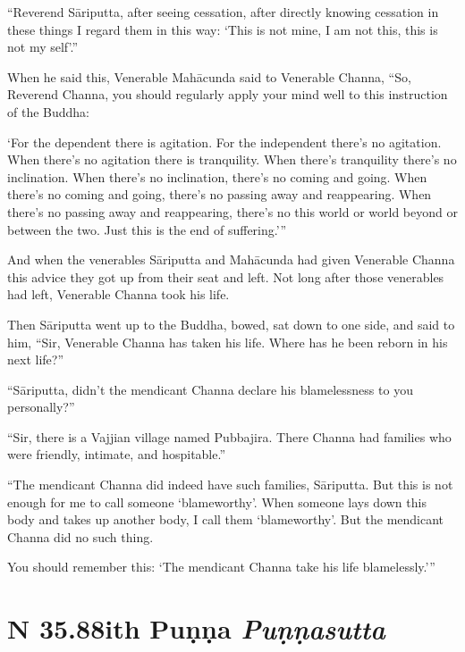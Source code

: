 \documentclass[12pt,openany]{book}%
\newcommand*{\suttatitleacronym}[1]{\smaller[2]{#1}\vspace*{.3em}}
\newcommand*{\suttatitletranslation}[1]{\linebreak{#1}}
\newcommand*{\suttatitleroot}[1]{\linebreak\smaller[2]\itshape{#1}}
\newcommand*{\tocacronym}[1]{\hspace*{-3.3em}{#1}\quad}
\newcommand*{\toctranslation}[1]{#1}
\newcommand*{\tocroot}[1]{(\textit{#1})}
\begin{document}
“Reverend \textsanskrit{Sāriputta}, after seeing cessation, after directly knowing cessation in these things I regard them in this way: ‘This is not mine, I am not this, this is not my self’.” 

When he said this, Venerable \textsanskrit{Mahācunda} said to Venerable Channa, “So, Reverend Channa, you should regularly apply your mind well to this instruction of the Buddha: 

‘For the dependent there is agitation. For the independent there’s no agitation. When there’s no agitation there is tranquility. When there’s tranquility there’s no inclination. When there’s no inclination, there’s no coming and going. When there’s no coming and going, there’s no passing away and reappearing. When there’s no passing away and reappearing, there’s no this world or world beyond or between the two. Just this is the end of suffering.’” 

And when the venerables \textsanskrit{Sāriputta} and \textsanskrit{Mahācunda} had given Venerable Channa this advice they got up from their seat and left. Not long after those venerables had left, Venerable Channa took his life. 

Then \textsanskrit{Sāriputta} went up to the Buddha, bowed, sat down to one side, and said to him, “Sir, Venerable Channa has taken his life. Where has he been reborn in his next life?” 

“\textsanskrit{Sāriputta}, didn’t the mendicant Channa declare his blamelessness to you personally?” 

“Sir, there is a Vajjian village named Pubbajira. There Channa had families who were friendly, intimate, and hospitable.” 

“The mendicant Channa did indeed have such families, \textsanskrit{Sāriputta}. But this is not enough for me to call someone ‘blameworthy’. When someone lays down this body and takes up another body, I call them ‘blameworthy’. But the mendicant Channa did no such thing. 

You should remember this: ‘The mendicant Channa take his life blamelessly.’” 

%
\section*{{\suttatitleacronym SN 35.88}{\suttatitletranslation With Puṇṇa }{\suttatitleroot Puṇṇasutta}}
\addcontentsline{toc}{section}{\tocacronym{SN 35.88} \toctranslation{With Puṇṇa } \tocroot{Puṇṇasutta}}
\end{document}
